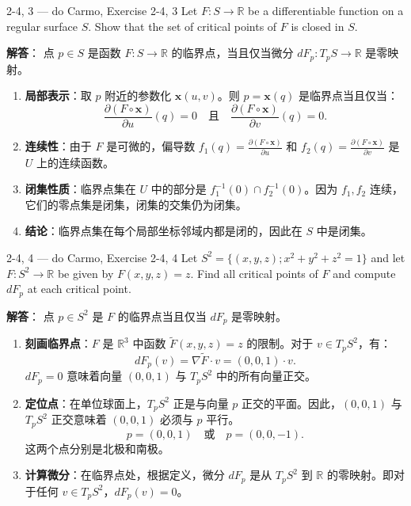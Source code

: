 \begin{exercise}{2-4, 3 — do Carmo, Exercise 2-4, 3}
Let $F: S \to \mathbb{R}$ be a differentiable function on a regular surface $S$. Show that the set of critical points of $F$ is closed in $S$.
\end{exercise}

\begin{solution}
\textbf{解答}：
点 $p \in S$ 是函数 $F: S \to \mathbb{R}$ 的临界点，当且仅当微分 $dF_p: T_pS \to \mathbb{R}$ 是零映射。

\begin{enumerate}
    \item \textbf{局部表示}：取 $p$ 附近的参数化 $\mathbf{x}(u, v)$。则 $p = \mathbf{x}(q)$ 是临界点当且仅当：
    \[
    \frac{\partial(F \circ \mathbf{x})}{\partial u}(q) = 0 \quad \text{且} \quad \frac{\partial(F \circ \mathbf{x})}{\partial v}(q) = 0.
    \]
    \item \textbf{连续性}：由于 $F$ 是可微的，偏导数 $f_1(q) = \frac{\partial(F \circ \mathbf{x})}{\partial u}$ 和 $f_2(q) = \frac{\partial(F \circ \mathbf{x})}{\partial v}$ 是 $U$ 上的连续函数。
    \item \textbf{闭集性质}：临界点集在 $U$ 中的部分是 $f_1^{-1}(0) \cap f_2^{-1}(0)$。因为 $f_1, f_2$ 连续，它们的零点集是闭集，闭集的交集仍为闭集。
    \item \textbf{结论}：临界点集在每个局部坐标邻域内都是闭的，因此在 $S$ 中是闭集。
\end{enumerate}
\end{solution}

\begin{exercise}{2-4, 4 — do Carmo, Exercise 2-4, 4}
Let $S^2 = \{(x,y,z); x^2+y^2+z^2 = 1\}$ and let $F: S^2 \to \mathbb{R}$ be given by $F(x,y,z) = z$. Find all critical points of $F$ and compute $dF_p$ at each critical point.
\end{exercise}

\begin{solution}
\textbf{解答}：
点 $p \in S^2$ 是 $F$ 的临界点当且仅当 $dF_p$ 是零映射。

\begin{enumerate}
    \item \textbf{刻画临界点}：$F$ 是 $\mathbb{R}^3$ 中函数 $\tilde{F}(x, y, z) = z$ 的限制。对于 $v \in T_pS^2$，有：
    \[
    dF_p(v) = \nabla\tilde{F} \cdot v = (0, 0, 1) \cdot v.
    \]
    $dF_p = 0$ 意味着向量 $(0, 0, 1)$ 与 $T_pS^2$ 中的所有向量正交。
    \item \textbf{定位点}：在单位球面上，$T_pS^2$ 正是与向量 $p$ 正交的平面。因此，$(0, 0, 1)$ 与 $T_pS^2$ 正交意味着 $(0, 0, 1)$ 必须与 $p$ 平行。
    \[
    p = (0, 0, 1) \quad \text{或} \quad p = (0, 0, -1).
    \]
    这两个点分别是北极和南极。
    \item \textbf{计算微分}：在临界点处，根据定义，微分 $dF_p$ 是从 $T_pS^2$ 到 $\mathbb{R}$ 的零映射。即对于任何 $v \in T_pS^2$，$dF_p(v) = 0$。
\end{enumerate}
\end{solution}

